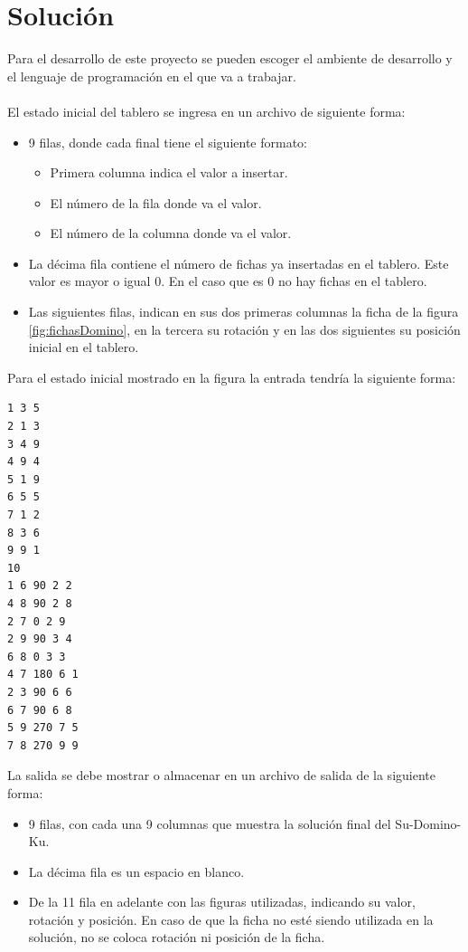 \documentclass[twocolumn]{article}
\begin{document}
\section{Solución}

Para el desarrollo de este proyecto se pueden escoger el ambiente de desarrollo y el lenguaje de
programación en el que va a trabajar.\\\\
El estado inicial del tablero se ingresa en un archivo de siguiente forma:

\begin{itemize}
	\item {9 filas, donde cada final tiene el siguiente formato:
		\begin{itemize}
			\item Primera columna indica el valor a insertar.
			\item El número de la fila donde va el valor.
			\item El número de la columna donde va el valor.
		\end{itemize}			
	}
	\item La décima fila contiene el número de fichas ya insertadas en el tablero. Este valor es mayor o igual $0$. En el caso que es $0$ no hay fichas en el tablero.
	\item Las siguientes filas, indican en sus dos primeras columnas la ficha de la figura \ref{fig:fichasDomino}, en la tercera su rotación y en las dos siguientes su posición inicial en el tablero.
\end{itemize}

Para el estado inicial mostrado en la figura \label{ref:inicial} la entrada tendría la siguiente forma:

\begin{lstlisting}
1 3 5
2 1 3
3 4 9
4 9 4
5 1 9
6 5 5
7 1 2
8 3 6
9 9 1
10
1 6 90 2 2
4 8 90 2 8
2 7 0 2 9
2 9 90 3 4
6 8 0 3 3
4 7 180 6 1
2 3 90 6 6
6 7 90 6 8
5 9 270 7 5
7 8 270 9 9
\end{lstlisting}

La salida se debe mostrar o almacenar en un archivo de salida de la siguiente forma:

\begin{itemize}
	\item 9 filas, con cada una 9 columnas que muestra la solución final del Su-Domino-Ku.
	\item La décima fila es un espacio en blanco.
	\item De la 11 fila en adelante con las figuras utilizadas, indicando su valor, rotación y posición. En caso de que la ficha no esté siendo utilizada en la solución, no se coloca rotación ni posición de la ficha.
\end{itemize}
\end{document}
